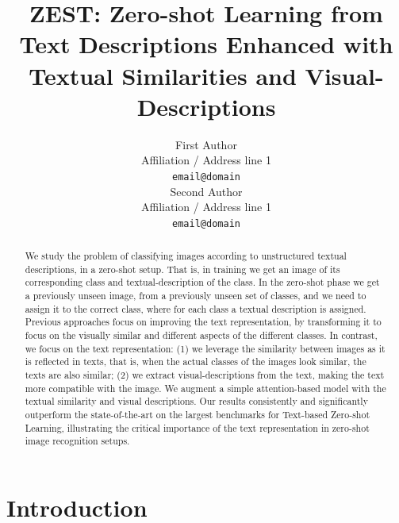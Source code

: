 \documentclass[11pt,a4paper]{article}
\title{ZEST:  Zero-shot Learning from Text Descriptions Enhanced with Textual Similarities and Visual-Descriptions}
\author{First Author \\
  Affiliation / Address line 1 \\
  \texttt{email@domain} \\\And
  Second Author \\
  Affiliation / Address line 1 \\
  \texttt{email@domain} \\}
\date{}
\newcommand\gal[1]{\textcolor{bright}{\textbf{GAL:} #1 }}
\newcommand\yuval[1]{\textcolor{darkpink}{\textbf{YUVAL:} #1 }}
\begin{document}
\maketitle
\begin{abstract}








We study the problem of classifying images according to unstructured textual descriptions, in a zero-shot setup. That is, in training we get an image of its corresponding class and textual-description of the class. In the zero-shot phase we get a previously unseen image, from a previously unseen set of classes, and we need to assign it to the correct class, where for each class a textual description is assigned.
Previous approaches focus on improving the text representation, by transforming it to focus on the visually similar and different aspects of the different classes. In contrast, we focus on the text representation: (1) we leverage the similarity between images as it is reflected in texts, that is, when the actual classes of the images look similar, the texts are also similar; (2) we extract visual-descriptions from the text, making the text more compatible with the image.
We augment a simple attention-based model with the textual similarity and visual descriptions. 
Our results consistently and significantly outperform the state-of-the-art on the largest benchmarks for Text-based Zero-shot Learning, illustrating the critical importance of the text representation in zero-shot image recognition setups. 

\end{abstract}




\section{Introduction}

\end{document}

